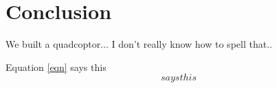 \section{Conclusion}
We built a quadcoptor... I don't really know how to spell that.. 


Equation \ref{eqn} says this
\begin{equation}
says this
\label{eqn}
\end{equation}
